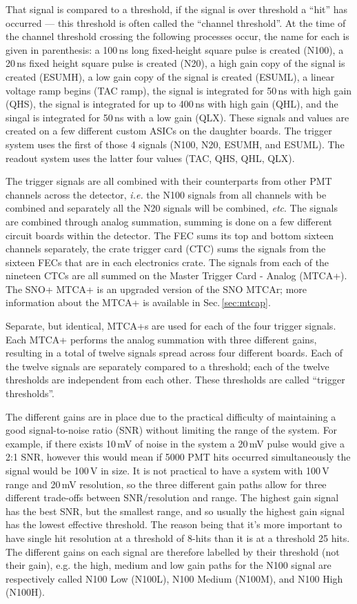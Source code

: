 That signal is compared to a threshold, if the signal is over threshold a ``hit''
has occurred --- this threshold is often called the ``channel threshold''.
At the time of the channel threshold crossing the following processes occur, the name for each is given
in parenthesis:
a 100\,ns long fixed-height square pulse is created (N100), a 20\,ns fixed height square pulse is created (N20),
a high gain copy of the signal is created (ESUMH), a low gain copy of the signal
is created (ESUML), a linear voltage ramp begins (TAC ramp), the signal is integrated for
50\,ns with high gain (QHS), the signal is integrated for up to 400\,ns with high gain (QHL),
and the singal is integrated for 50\,ns with a low gain (QLX).
These signals and values are created on a few different custom ASICs on the
daughter boards.
The trigger system uses the first of those 4 signals (N100, N20, ESUMH, and ESUML).
The readout system uses the latter four values (TAC, QHS, QHL, QLX).

The trigger signals are all combined with their counterparts from
other PMT channels across the detector, \textit{i.e.} the N100 signals
from all channels with be combined and separately all the
N20 signals will be combined, \textit{etc}.
The signals are combined through analog summation, summing is done on a few different
circuit boards within the detector.
The FEC sums its top and bottom sixteen channels separately, the crate
trigger card (CTC) sums the signals from the sixteen
FECs that are in each electronics crate.
The signals from each of the nineteen CTCs are all summed on the
Master Trigger Card - Analog (MTCA+). The SNO+ MTCA+ is an upgraded
version of the SNO MTCAr; more information about the MTCA+ is available in
Sec.\,\ref{sec:mtcap}.

Separate, but identical, MTCA+s are used for each of the four trigger signals.
Each MTCA+ performs the analog summation with three different gains,
resulting in a total of twelve signals spread across four different boards.
Each of the twelve signals are separately compared to a threshold;
each of the twelve thresholds are independent from each other.
These thresholds are called ``trigger thresholds''.

The different gains are in place due to the practical difficulty of maintaining
a good signal-to-noise ratio (SNR) without limiting the range of the
system.
For example, if there exists 10\,mV of noise in the system a 20\,mV pulse
would give a 2:1 SNR, however this would mean if 5000 PMT hits occurred simultaneously
the signal would be 100\,V in size.
It is not practical to have a system with 100\,V range and 20\,mV resolution,
so the three different gain paths allow for three different trade-offs between
SNR/resolution and range.
The highest gain signal has the best SNR, but the smallest range, and so usually
the highest gain signal has the lowest effective threshold.
The reason being that it's more important to have single hit resolution at a threshold
of 8-hits than it is at a threshold 25 hits.
The different gains on each signal are therefore labelled by their threshold (not their gain), e.g.
the high, medium and low gain paths for the N100 signal are respectively called
N100 Low (N100L), N100 Medium (N100M), and N100 High (N100H).

